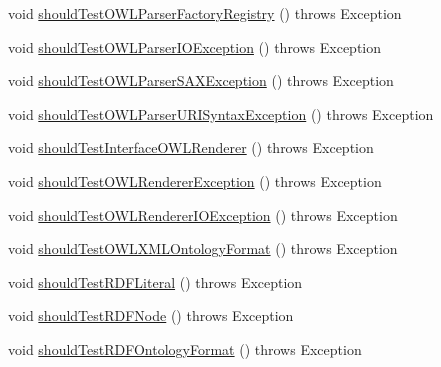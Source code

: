 \begin{DoxyCompactItemize}
\item 
void \hyperlink{classorg_1_1semanticweb_1_1owlapi_1_1contract_1_1_contract_owlapi_io_test_a8e20148a44b97f27d355cea561e70c0a}{should\-Test\-O\-W\-L\-Parser\-Factory\-Registry} ()  throws Exception 
\item 
void \hyperlink{classorg_1_1semanticweb_1_1owlapi_1_1contract_1_1_contract_owlapi_io_test_a5e7ed6e1fdebaac342976020735f2ebb}{should\-Test\-O\-W\-L\-Parser\-I\-O\-Exception} ()  throws Exception 
\item 
void \hyperlink{classorg_1_1semanticweb_1_1owlapi_1_1contract_1_1_contract_owlapi_io_test_ac8d2675e07dbcb0859c89b94617e46ad}{should\-Test\-O\-W\-L\-Parser\-S\-A\-X\-Exception} ()  throws Exception 
\item 
void \hyperlink{classorg_1_1semanticweb_1_1owlapi_1_1contract_1_1_contract_owlapi_io_test_aca5f750ac7779e8a9e049f387485b310}{should\-Test\-O\-W\-L\-Parser\-U\-R\-I\-Syntax\-Exception} ()  throws Exception 
\item 
void \hyperlink{classorg_1_1semanticweb_1_1owlapi_1_1contract_1_1_contract_owlapi_io_test_a0fc9e1aeedb0da72bed0adfb9e60327e}{should\-Test\-Interface\-O\-W\-L\-Renderer} ()  throws Exception 
\item 
void \hyperlink{classorg_1_1semanticweb_1_1owlapi_1_1contract_1_1_contract_owlapi_io_test_a7619578ce3736a7707b1b7959adb1046}{should\-Test\-O\-W\-L\-Renderer\-Exception} ()  throws Exception 
\item 
void \hyperlink{classorg_1_1semanticweb_1_1owlapi_1_1contract_1_1_contract_owlapi_io_test_aec992d499690139ca9d71fc7deed3c2a}{should\-Test\-O\-W\-L\-Renderer\-I\-O\-Exception} ()  throws Exception 
\item 
void \hyperlink{classorg_1_1semanticweb_1_1owlapi_1_1contract_1_1_contract_owlapi_io_test_a6912284684a2e4ea42650ee1af6c7655}{should\-Test\-O\-W\-L\-X\-M\-L\-Ontology\-Format} ()  throws Exception 
\item 
void \hyperlink{classorg_1_1semanticweb_1_1owlapi_1_1contract_1_1_contract_owlapi_io_test_aa983d10ad82e4a187d29833f0d840bd1}{should\-Test\-R\-D\-F\-Literal} ()  throws Exception 
\item 
void \hyperlink{classorg_1_1semanticweb_1_1owlapi_1_1contract_1_1_contract_owlapi_io_test_ad51f56a25014cc88691645341c6fe278}{should\-Test\-R\-D\-F\-Node} ()  throws Exception 
\item 
void \hyperlink{classorg_1_1semanticweb_1_1owlapi_1_1contract_1_1_contract_owlapi_io_test_ab81499cba6c9df3636206125fa648e48}{should\-Test\-R\-D\-F\-Ontology\-Format} ()  throws Exception 

\end{DoxyCompactItemize}
